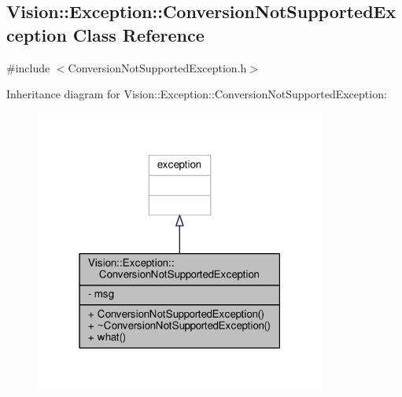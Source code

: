 \hypertarget{class_vision_1_1_exception_1_1_conversion_not_supported_exception}{}\subsection{Vision\+:\+:Exception\+:\+:Conversion\+Not\+Supported\+Exception Class Reference}
\label{class_vision_1_1_exception_1_1_conversion_not_supported_exception}


{\ttfamily \#include $<$Conversion\+Not\+Supported\+Exception.\+h$>$}



Inheritance diagram for Vision\+:\+:Exception\+:\+:Conversion\+Not\+Supported\+Exception\+:
\nopagebreak
\begin{figure}[H]
\begin{center}
\leavevmode
\includegraphics[width=271pt]{class_vision_1_1_exception_1_1_conversion_not_supported_exception__inherit__graph}
\end{center}
\end{figure}


